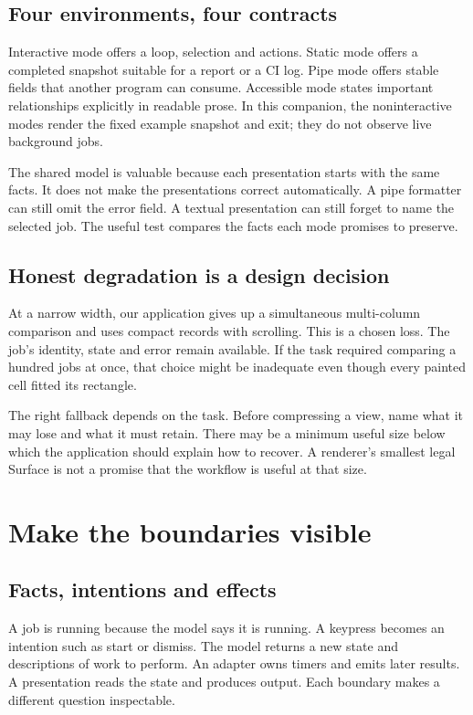 \subsection{Four environments, four contracts}

Interactive mode offers a loop, selection and actions. Static mode offers a completed snapshot suitable for a report or a CI log. Pipe mode offers stable fields that another program can consume. Accessible mode states important relationships explicitly in readable prose. In this companion, the noninteractive modes render the fixed example snapshot and exit; they do not observe live background jobs.

The shared model is valuable because each presentation starts with the same facts. It does not make the presentations correct automatically. A pipe formatter can still omit the error field. A textual presentation can still forget to name the selected job. The useful test compares the facts each mode promises to preserve.

\subsection{Honest degradation is a design decision}

At a narrow width, our application gives up a simultaneous multi-column comparison and uses compact records with scrolling. This is a chosen loss. The job's identity, state and error remain available. If the task required comparing a hundred jobs at once, that choice might be inadequate even though every painted cell fitted its rectangle.

The right fallback depends on the task. Before compressing a view, name what it may lose and what it must retain. There may be a minimum useful size below which the application should explain how to recover. A renderer's smallest legal Surface is not a promise that the workflow is useful at that size.

\section{Make the boundaries visible}
\subsection{Facts, intentions and effects}

A job is running because the model says it is running. A keypress becomes an intention such as start or dismiss. The model returns a new state and descriptions of work to perform. An adapter owns timers and emits later results. A presentation reads the state and produces output. Each boundary makes a different question inspectable.

